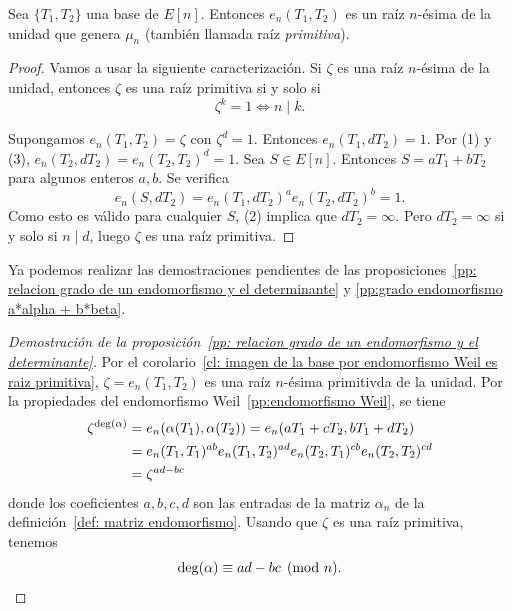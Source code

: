 \begin{corolario}\label{cl: imagen de la base por endomorfismo Weil es raiz primitiva}
	Sea $\{ T_1, T_2 \}$ una base de $E[n]$. Entonces $e_n(T_1, T_2)$ es un raíz $n$-ésima de la unidad que genera $\mu_n$ (también llamada raíz \emph{primitiva}).
\end{corolario}
\begin{proof}
Vamos a usar la siguiente caracterización. Si $\zeta$ es una raíz $n$-ésima de la unidad, entonces $\zeta$ es una raíz primitiva si y solo si
$$
	\zeta^k = 1 \iff n \mid k.
$$

Supongamos $e_n(T_1, T_2) = \zeta$ con $\zeta ^ d = 1$. Entonces $e_n(T_1, d T_2) = 1$. Por (1) y (3), $e_n(T_2, d T_2) = e_n(T_2, T_2)^d = 1$. Sea $S \in E[n]$. Entonces $S = a T_1 + b T_2$ para algunos enteros $a, b$. Se verifica
$$
	e_n(S, d T_2) = e_n(T_1, d T_2)^a e_n(T_2, d T_2)^b = 1.
$$
Como esto es válido para cualquier $S$, (2) implica que $d T_2 = \infty$. Pero $d T_2 = \infty$ si y solo si $n \mid d$, luego $\zeta$ es una raíz primitiva.
\end{proof}

Ya podemos realizar las demostraciones pendientes de las proposiciones~\ref{pp: relacion grado de un endomorfismo y el determinante} y \ref{pp:grado endomorfismo a*alpha + b*beta}.

\begin{proof}[Demostración de la proposición~\ref{pp: relacion grado de un endomorfismo y el determinante}]
Por el corolario~\ref{cl: imagen de la base por endomorfismo Weil es raiz primitiva}, $\zeta = e_n(T_1, T_2)$ es una raíz $n$-ésima primitivda de la unidad. Por la propiedades del endomorfismo Weil~\ref{pp:endomorfismo Weil}, se tiene
\begin{align*}
	\zeta^{\deg(\alpha)} &= e_n(\alpha(T_1),\alpha(T_2)) = e_n(a T_1 + c T_2, b T_1 + d T_2) \\
		&= e_n(T_1, T_1)^{a b} e_n(T_1, T_2)^{a d} e_n(T_2, T_1)^{c b} e_n(T_2, T_2)^{c d} \\
		&= \zeta^{a d - b c}
\end{align*}
donde los coeficientes $a, b, c, d$ son las entradas de la matriz $\alpha_n$ de la definición~\ref{def: matriz endomorfismo}. Usando que $\zeta$ es una raíz primitiva, tenemos
$$
	\deg(\alpha) \equiv a d - b c \pmod{n}.
$$
\end{proof}

